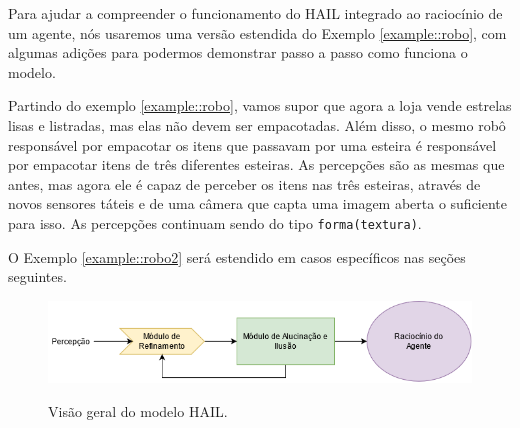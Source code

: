 
Para ajudar a compreender o funcionamento do HAIL integrado ao raciocínio de um agente, nós usaremos uma versão estendida do Exemplo \ref{example::robo}, com algumas adições para podermos demonstrar passo a passo como funciona o modelo.

\begin{example}
    Partindo do exemplo \ref{example::robo}, vamos supor que agora a loja vende estrelas lisas e listradas, mas elas não devem ser empacotadas. Além disso, o mesmo robô responsável por empacotar os itens que passavam por uma esteira é responsável por empacotar itens de três diferentes esteiras. As percepções são as mesmas que antes, mas agora ele é capaz de perceber os itens nas três esteiras, através de novos sensores táteis e de uma câmera que capta uma imagem aberta o suficiente para isso. As percepções continuam sendo do tipo \texttt{forma(textura)}.
    \label{example::robo2}
\end{example}{}

O Exemplo \ref{example::robo2} será estendido em casos específicos nas seções seguintes.

\begin{figure}[h!]
    \centering
    \caption{Visão geral do modelo HAIL.}
    \includegraphics[width=1\textwidth]{images/modelo_geral.png}
    \label{fig:method}
\end{figure}


